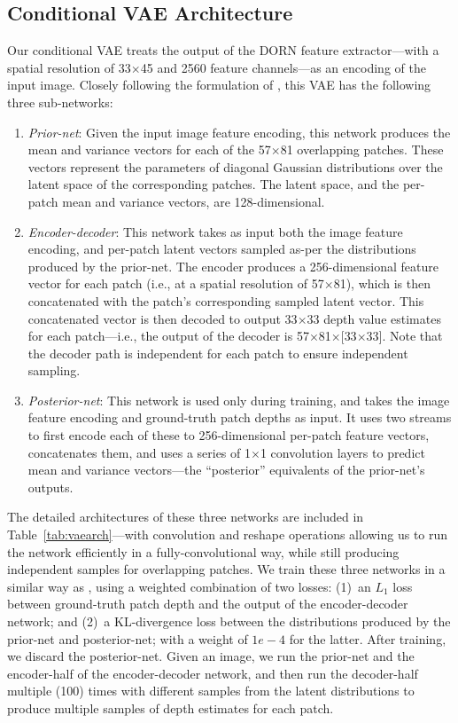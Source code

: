 \documentclass[10pt,twocolumn,letterpaper]{article}
\begin{document}
\subsection{Conditional VAE Architecture}

Our conditional VAE treats the output of the DORN feature extractor---with a spatial resolution of 33$\times$45 and 2560 feature channels---as an encoding of the input image. Closely following the formulation of \cite{condVAE}, this VAE has the following three sub-networks:
\begin{enumerate}
\item \emph{Prior-net}: Given the input image feature encoding, this network produces the mean and variance vectors for each of the 57$\times$81 overlapping patches. These vectors represent the parameters of diagonal Gaussian distributions over the latent space of the corresponding patches. The latent space, and the per-patch mean and variance vectors, are 128-dimensional.
\item \emph{Encoder-decoder}: This network takes as input both the image feature encoding, and per-patch latent vectors sampled as-per the distributions produced by the prior-net.  The encoder produces a 256-dimensional feature vector for each patch (i.e., at a spatial resolution of 57$\times$81), which is then concatenated with the patch's corresponding sampled latent vector. This concatenated vector is then decoded to output 33$\times$33 depth value estimates for each patch---i.e., the output of the decoder is 57$\times$81$\times[$33$\times$33$]$. Note that the decoder path is independent for each patch to ensure independent sampling.
\item \emph{Posterior-net}: This network is used only during training, and takes the image feature encoding and ground-truth patch depths as input. It uses two streams to first encode each of these to 256-dimensional per-patch feature vectors, concatenates them, and uses a series of 1$\times$1 convolution layers to predict mean and variance vectors---the ``posterior'' equivalents of the prior-net's outputs.
\end{enumerate}

The detailed architectures of these three networks are included in Table~\ref{tab:vaearch}---with convolution and reshape operations allowing us to run the network efficiently in a fully-convolutional way, while still producing independent samples for overlapping patches. We train these three networks in a similar way as \cite{condVAE}, using a weighted combination of two losses: (1)~an $L_1$ loss between ground-truth patch depth and the output of the encoder-decoder network; and (2)~a KL-divergence loss between the distributions produced by the prior-net and posterior-net; with a weight of $1e-4$ for the latter. After training, we discard the posterior-net. Given an image, we run the prior-net and the encoder-half of the encoder-decoder network, and then run the decoder-half multiple (100) times with different samples from the latent distributions to produce multiple samples of depth estimates for each patch.
\end{document}
